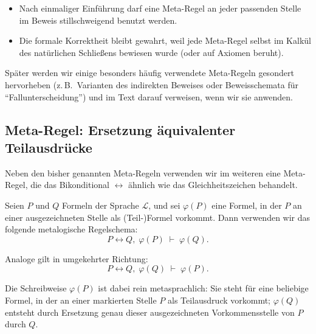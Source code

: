 \documentclass[main.tex]{subfiles}
\begin{document}
\begin{itemize}
  \item Nach einmaliger Einführung darf eine Meta-Regel an jeder
        passenden Stelle im Beweis stillschweigend benutzt werden.
  \item Die formale Korrektheit bleibt gewahrt, weil jede Meta-Regel
        selbst im Kalkül des natürlichen Schließens bewiesen wurde
        (oder auf Axiomen beruht).
\end{itemize}

Später werden wir einige besonders häufig verwendete Meta-Regeln
gesondert hervorheben (z.\,B.\ Varianten des indirekten Beweises
oder Beweisschemata für \enquote{Fallunterscheidung}) und im Text
darauf verweisen, wenn wir sie anwenden.

\subsection{Meta-Regel: Ersetzung äquivalenter Teilausdrücke}


Neben den bisher genannten Meta-Regeln verwenden wir im weiteren
eine Meta-Regel, die das Bikonditional \(\leftrightarrow\) ähnlich
wie das Gleichheitszeichen behandelt.

\begin{definition}\label{rule:LRSubst}
Seien \(P\) und \(Q\) Formeln der Sprache \(\mathcal L\), und sei
\(\varphi(P)\) eine Formel, in der \(P\) an einer ausgezeichneten
Stelle als (Teil-)Formel vorkommt. Dann verwenden wir das folgende
metalogische Regelschema:
\[
  P \leftrightarrow Q,\; \varphi(P) \;\vdash\; \varphi(Q).
\]

Analoge gilt in umgekehrter Richtung:
\[
  P \leftrightarrow Q,\; \varphi(Q) \;\vdash\; \varphi(P).
\]

Die Schreibweise \(\varphi(P)\) ist dabei rein metasprachlich:
Sie steht für eine beliebige Formel, in der an einer markierten
Stelle \(P\) als Teilausdruck vorkommt; \(\varphi(Q)\) entsteht
durch Ersetzung genau dieser ausgezeichneten Vorkommensstelle von
\(P\) durch \(Q\).
\end{definition}

\end{document}
